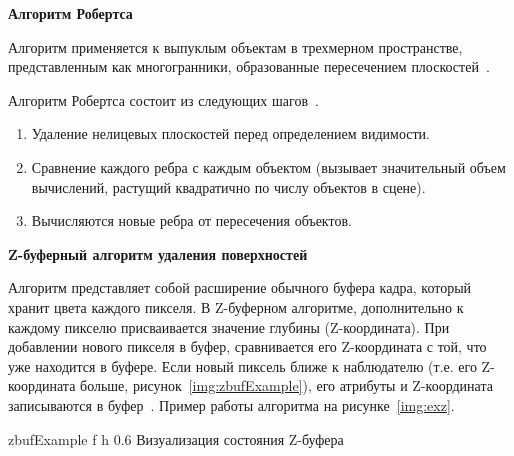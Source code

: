 \textbf{Алгоритм Робертса} 

Алгоритм применяется к выпуклым объектам в трехмерном пространстве, представленным как многогранники, образованные пересечением плоскостей~\cite{del_line}.

Алгоритм Робертса состоит из следующих шагов~\cite{del_line}.
\begin{enumerate}
	\item Удаление нелицевых плоскостей перед определением видимости.
	\item Сравнение каждого ребра с каждым объектом (вызывает значительный объем вычислений, растущий квадратично по числу объектов в сцене).
	\item Вычисляются новые ребра от пересечения объектов. 
\end{enumerate}
	





\textbf{Z-буферный алгоритм удаления поверхностей}

Алгоритм представляет собой расширение обычного буфера кадра, который хранит цвета каждого пикселя.
В Z-буферном алгоритме, дополнительно к каждому пикселю присваивается значение глубины (Z-координата).
При добавлении нового пикселя в буфер, сравнивается его Z-координата с той, что уже находится в буфере.
Если новый пиксель ближе к наблюдателю (т.е. его Z-координата больше, рисунок~\ref{img:zbufExample}), его атрибуты и Z-координата записываются в буфер~\cite{del_line}.
Пример работы алгоритма на рисунке~\ref{img:exz}. 
	
	{zbufExample} %
	{f} %
	{h} %
	{0.6\textwidth} %
	{Визуализация состояния Z-буфера} %

